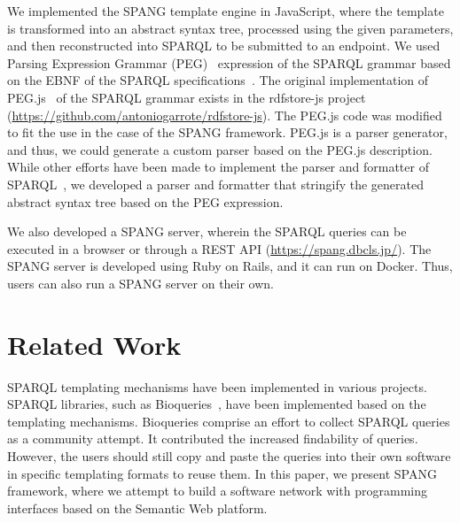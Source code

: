 \documentclass[runningheads]{llncs}
\begin{document}
We implemented the SPANG template engine in JavaScript, where the template is transformed into an abstract syntax tree, processed using the given parameters, and then reconstructed into SPARQL to be submitted to an endpoint. 
We used Parsing Expression Grammar (PEG)~\cite{peg} expression of the SPARQL grammar based on the EBNF of the SPARQL specifications~\cite{sparql}. The original implementation of PEG.js~\cite{pegjs} of the SPARQL grammar exists in the rdfstore-js project (\url{https://github.com/antoniogarrote/rdfstore-js}).
The PEG.js code was modified to fit the use in the case of the SPANG framework.
PEG.js is a parser generator, and thus, we could generate a custom parser based on the PEG.js description. 
While other efforts have been made to implement the parser and formatter of SPARQL~\cite{sparql-js}, we developed a parser and formatter that stringify the generated abstract syntax tree based on the PEG expression. %

We also developed a SPANG server, wherein the SPARQL queries can be executed in a browser or through a REST API (\url{https://spang.dbcls.jp/}).
The SPANG server is developed using Ruby on Rails, and it can run on Docker.
Thus, users can also run a SPANG server on their own. 

\section{Related Work}

SPARQL templating mechanisms have been implemented in various projects. SPARQL libraries, such as Bioqueries~\cite{bioqueries}, have been implemented based on the templating mechanisms. Bioqueries comprise an effort to collect SPARQL queries as a community attempt. It contributed the increased findability of queries.
However, the users should still copy and paste the queries into their own software in specific templating formats to reuse them.
In this paper, we present SPANG framework, where we attempt to build a software network with programming interfaces based on the Semantic Web platform.
\end{document}
